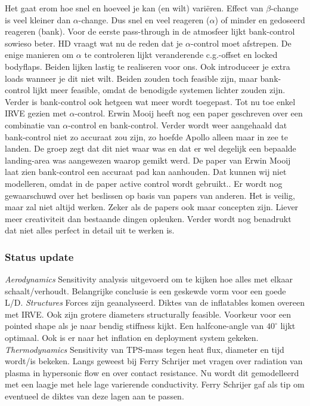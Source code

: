 Het gaat erom hoe snel en hoeveel je kan (en wilt) vari\"{e}ren. Effect van $\beta$-change is veel kleiner dan $\alpha$-change. Dus snel en veel reageren ($\alpha$) of minder en gedoseerd reageren (bank). Voor de eerste pass-through in de atmosfeer lijkt bank-control sowieso beter. HD vraagt wat nu de reden dat je $\alpha$-control moet afstrepen. De enige manieren om $\alpha$ te controleren lijkt veranderende c.g.-offset en locked bodyflaps. Beiden lijken lastig te realiseren voor ons. Ook introduceer je extra loads wanneer je dit niet wilt. Beiden zouden toch feasible zijn, maar bank-control lijkt meer feasible, omdat de benodigde systemen lichter zouden zijn. Verder is bank-control ook hetgeen wat meer wordt toegepast. Tot nu toe enkel IRVE gezien met $\alpha$-control. Erwin Mooij heeft nog een paper geschreven over een combinatie van $\alpha$-control en bank-control. Verder wordt weer aangehaald dat bank-control niet zo accuraat zou zijn, zo hoefde Apollo alleen maar in zee te landen. De groep zegt dat dit niet waar was en dat er wel degelijk een bepaalde landing-area was aangewezen waarop gemikt werd. De paper van Erwin Mooij laat zien bank-control een accuraat pad kan aanhouden. Dat kunnen wij niet modelleren, omdat in de paper active control wordt gebruikt..
\newline\newline
Er wordt nog gewaarschuwd over het beslissen op basis van papers van anderen. Het is veilig, maar zal niet altijd werken. Zeker als de papers ook maar concepten zijn. Liever meer creativiteit dan bestaande dingen opleuken. Verder wordt nog benadrukt dat niet alles perfect in detail uit te werken is.

\subsubsection{Status update}
\textit{Aerodynamics}\newline
Sensitivity analysis uitgevoerd om te kijken hoe alles met elkaar schaalt/verhoudt. Belangrijke conclusie is een geskewde vorm voor een goede L/D.
\newline\newline
\textit{Structures}\newline
Forces zijn geanalyseerd. Diktes van de inflatables komen overeen met IRVE. Ook zijn grotere diameters structurally feasible. Voorkeur voor een pointed shape als je naar bendig stiffness kijkt. Een halfcone-angle van $40^{\circ}$ lijkt optimaal. Ook is er naar het inflation en deployment system gekeken.
\newline\newline
\textit{Thermodynamics}\newline
Sensitivity van TPS-mass tegen heat flux, diameter en tijd wordt/is bekeken. Langs geweest bij Ferry Schrijer met vragen over radiation van plasma in hypersonic flow en over contact resistance. Nu wordt dit gemodelleerd met een laagje met hele lage varierende conductivity. Ferry Schrijer gaf als tip om eventueel de diktes van deze lagen aan te passen.

